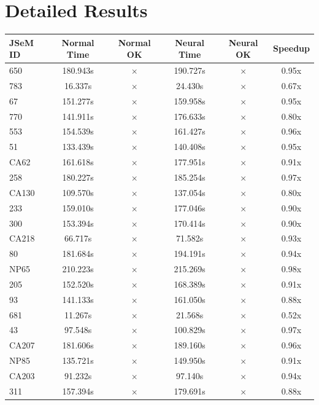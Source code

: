 \documentclass[a4paper,10pt]{article}
\begin{document}
\section{Detailed Results}
\begin{longtable}{lccccc}
\toprule
\textbf{JSeM ID} & \textbf{Normal Time} & \textbf{Normal OK} & \textbf{Neural Time} & \textbf{Neural OK} & \textbf{Speedup} \\
\midrule
\endhead
650 & 180.943s & $\times$ & 190.727s & $\times$ & 0.95x \\
783 & 16.337s & $\times$ & 24.430s & $\times$ & 0.67x \\
67 & 151.277s & $\times$ & 159.958s & $\times$ & 0.95x \\
770 & 141.911s & $\times$ & 176.633s & $\times$ & 0.80x \\
553 & 154.539s & $\times$ & 161.427s & $\times$ & 0.96x \\
51 & 133.439s & $\times$ & 140.408s & $\times$ & 0.95x \\
CA62 & 161.618s & $\times$ & 177.951s & $\times$ & 0.91x \\
258 & 180.227s & $\times$ & 185.254s & $\times$ & 0.97x \\
CA130 & 109.570s & $\times$ & 137.054s & $\times$ & 0.80x \\
233 & 159.010s & $\times$ & 177.046s & $\times$ & 0.90x \\
300 & 153.394s & $\times$ & 170.414s & $\times$ & 0.90x \\
CA218 & 66.717s & $\times$ & 71.582s & $\times$ & 0.93x \\
80 & 181.684s & $\times$ & 194.191s & $\times$ & 0.94x \\
NP65 & 210.223s & $\times$ & 215.269s & $\times$ & 0.98x \\
205 & 152.520s & $\times$ & 168.389s & $\times$ & 0.91x \\
93 & 141.133s & $\times$ & 161.050s & $\times$ & 0.88x \\
681 & 11.267s & $\times$ & 21.568s & $\times$ & 0.52x \\
43 & 97.548s & $\times$ & 100.829s & $\times$ & 0.97x \\
CA207 & 181.606s & $\times$ & 189.160s & $\times$ & 0.96x \\
NP85 & 135.721s & $\times$ & 149.950s & $\times$ & 0.91x \\
CA203 & 91.232s & $\times$ & 97.140s & $\times$ & 0.94x \\
311 & 157.394s & $\times$ & 179.691s & $\times$ & 0.88x \\

\end{longtable}
\end{document}
